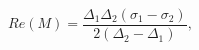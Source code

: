 \begin{equation}
Re(M) = \frac{\Delta_1 \Delta_2(\sigma_1 - \sigma_2)}
{2(\Delta_2 - \Delta_1)},
\end{equation}

